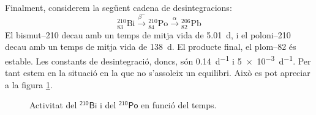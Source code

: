 \documentclass[12pt]{article}
\begin{document}
Finalment, considerem la següent cadena de desintegracions:
\begin{equation*}
	{}^{210}_{83}\text{Bi} \xrightarrow{\beta^-} {}^{210}_{84}\text{Po} \xrightarrow{\alpha} {}^{206}_{82}\text{Pb}
\end{equation*}
El bismut--210 decau amb un temps de mitja vida de \SI{5.01}{d}, i el poloni--210 decau amb un temps de mitja vida de \SI{138}{d}. El producte final, el plom--82 és estable. Les constants de desintegració, doncs, són \SI{0,14}{d^{-1}} i \SI{5e-3}{d^{-1}}. Per tant estem en la situació en la que no s'assoleix un equilibri. Això es pot apreciar a la figura \ref{fig:no equilibri}.

\begin{figure}
	\center
	
	\caption{Activitat del \( \mathsf{{}^{210}\text{Bi}} \) i del \( \mathsf{{}^{210}\text{Po}} \) en funció del temps.}
	\label{fig:no equilibri}
\end{figure}
\end{document}
